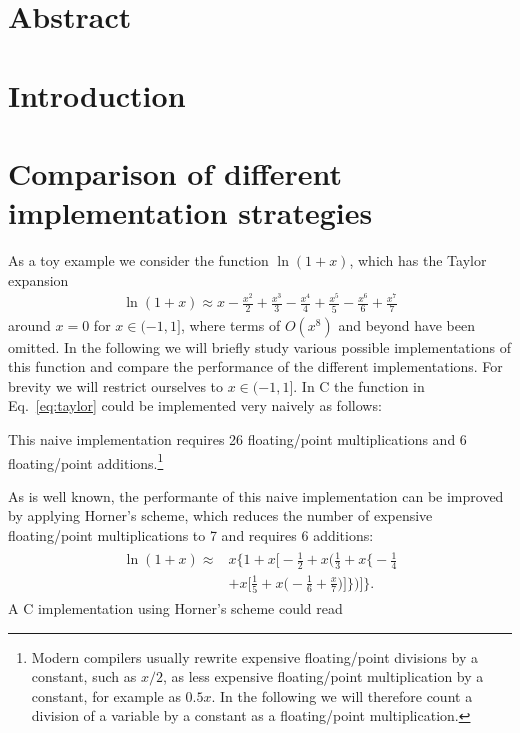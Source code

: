 \documentclass[10pt,DIV16,twocolumn]{scrartcl}
\title{\mytitle}
\author{\myauthor}
\affil{Fachbereich Energie und Biotechnologie, Hochschule Flensburg,\\ Kanzleistra{\ss}e 91--93, 24943 Flensburg, Germany}
\date{\today}
\begin{document}
\maketitle

\section*{Abstract}

\section{Introduction}

\cite{polylogarithm}

\section{Comparison of different implementation strategies}

As a toy example we consider the function $\ln(1+x)$, which has the
Taylor expansion
%
\begin{align}
  \ln(1+x) \approx x - \frac{x^2}{2} + \frac{x^3}{3} - \frac{x^4}{4} + \frac{x^5}{5} - \frac{x^6}{6} + \frac{x^7}{7}
  \label{eq:taylor}
\end{align}
%
around $x=0$ for $x\in(-1,1]$, where terms of $O(x^8)$ and beyond have
been omitted.  In the following we will briefly study various possible
implementations of this function and compare the performance of the
different implementations.  For brevity we will restrict ourselves to
$x\in(-1,1]$.  In C the function in Eq.~\eqref{eq:taylor} could be
implemented very naively as follows:
%

%
This naive implementation requires 26 floating\-/point multiplications
and 6 floating\-/point additions.\footnote{Modern compilers usually
  rewrite expensive floating\-/point divisions by a constant, such as
  $x/2$, as less expensive floating\-/point multiplication by a
  constant, for example as $0.5x$.  In the following we will therefore
  count a division of a variable by a constant as a floating\-/point
  multiplication.}

As is well known, the performante of this naive implementation can be
improved by applying Horner's scheme, which reduces the number of
expensive floating\-/point multiplications to 7 and requires 6
additions:
%
\begin{align}
\begin{split}
  \ln(1+x) \approx{}& x \Bigg\{1 + x \Bigg[-\frac{1}{2} + x \Bigg(\frac{1}{3} + x \Bigg\{-\frac{1}{4} \\
  &+ x \Bigg[\frac{1}{5} + x\Bigg(-\frac{1}{6} + \frac{x}{7}\Bigg)\Bigg]\Bigg\}\Bigg)\Bigg]\Bigg\}.
\end{split}\label{eq:horner}%
\end{align}
%
A C implementation using Horner's scheme could read
%

\end{document}
